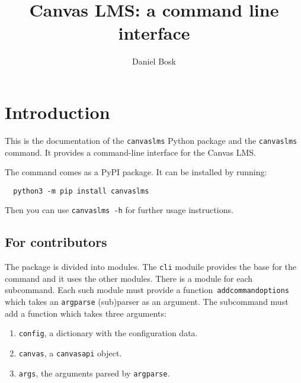 \documentclass[a4paper,oneside]{book}
\title{%
  Canvas LMS: a command line interface
}
\author{%
  Daniel Bosk
}
\affil{%
  KTH EECS
}
\newenvironment{abstract}{}{}
\begin{document}
\frontmatter
\maketitle

\vspace*{\fill}
\clearpage

\begin{abstract}
  
\end{abstract}
\clearpage


\tableofcontents
\clearpage

\mainmatter


\chapter{Introduction}

This is the documentation of the \texttt{canvaslms} Python package and the 
\texttt{canvaslms} command.
It provides a command-line interface for the Canvas LMS\@.

The command comes as a PyPI package.
It can be installed by running:
\begin{verbatim}
  python3 -m pip install canvaslms
\end{verbatim}
Then you can use \texttt{canvaslms -h} for further usage instructions.

\section{For contributors}

The package is divided into modules.
The \texttt{cli} moduile provides the base for the command and it uses the 
other modules.
There is a module for each subcommand.
Each such module must provide a
function~\texttt{add\textunderscore{}command\textunderscore{}options} which 
takes an \texttt{argparse} (sub)parser as an argument.
The subcommand must add a function which takes three arguments:
\begin{enumerate}
  \item \texttt{config}, a dictionary with the configuration data.
  \item \texttt{canvas}, a \texttt{canvasapi} object.
  \item \texttt{args}, the arguments parsed by \texttt{argparse}.
\end{enumerate}






%
%
%


\printbibliography
\end{document}
